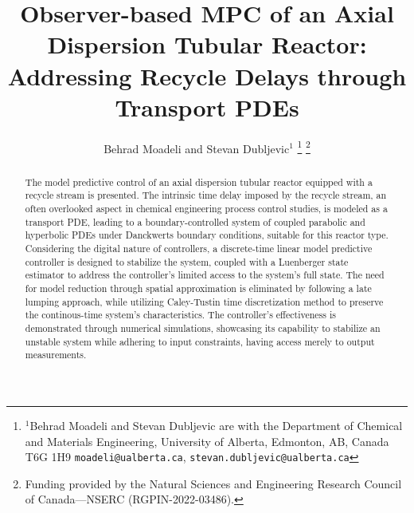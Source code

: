\documentclass[letterpaper, 10 pt, conference]{ieeeconf}  %
\title{\LARGE \bf
Observer-based MPC of an Axial Dispersion Tubular Reactor:\\ Addressing Recycle Delays through Transport PDEs
}
\author{Behrad Moadeli and Stevan Dubljevic$^{1}$%
\thanks{$^{1}$Behrad Moadeli and Stevan Dubljevic are with the Department of Chemical and Materials Engineering,
University of Alberta, Edmonton, AB, Canada T6G 1H9
{\tt\small moadeli@ualberta.ca}, {\tt\small stevan.dubljevic@ualberta.ca}}%
\thanks{Funding provided by the Natural Sciences and Engineering Research Council of Canada—NSERC (RGPIN-2022-03486).}%
}
\begin{document}
\maketitle
\thispagestyle{empty}
\pagestyle{empty}


\begin{abstract}

        The model predictive control of an axial dispersion tubular reactor equipped with a recycle stream is presented. The intrinsic time delay imposed by the recycle stream, an often overlooked aspect in chemical engineering process control studies, is modeled as a transport PDE, leading to a boundary-controlled system of coupled parabolic and hyperbolic PDEs under Danckwerts boundary conditions, suitable for this reactor type. Considering the digital nature of controllers, a discrete-time linear model predictive controller is designed to stabilize the system, coupled with a Luenberger state estimator to address the controller's limited access to the system's full state. The need for model reduction through spatial approximation is eliminated by following a late lumping approach, while utilizing Caley-Tustin time discretization method to preserve the continous-time system's characteristics. The controller's effectiveness is demonstrated through numerical simulations, showcasing its capability to stabilize an unstable system while adhering to input constraints, having access merely to output measurements.

\end{abstract}







% 

% 

\balance

\end{document}
